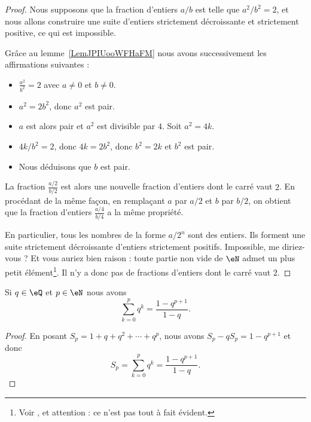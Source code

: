 \begin{proof}
    Nous supposons que la fraction d'entiers \( a/b\) est telle que \( a^2/b^2=2\), et nous allons construire une suite d'entiers strictement décroissante et strictement positive, ce qui est impossible.

    Grâce au lemme~\ref{LemJPIUooWFHaFM} nous avons successivement les affirmations suivantes :
    \begin{itemize}
        \item
        \(\frac{ a^2 }{ b^2 }=2 \)  avec \( a\neq 0\) et \( b\neq 0\).
    \item
        \( a^2=2b^2\), donc \( a^2\) est pair.
    \item
        \( a\) est alors pair et \( a^2\) est divisible par \( 4\). Soit \( a^2=4k\).
    \item
        \( 4k/b^2=2\), donc \( 4k=2b^2\), donc \( b^2=2k\) et \( b^2\) est pair.
    \item
        Nous déduisons que \( b\) est pair.
    \end{itemize}
    La fraction \( \frac{ a/2 }{ b/2 }\) est alors une nouvelle fraction d'entiers dont le carré vaut $2$. En procédant de la même façon, en remplaçant \( a\) par \( a/2\) et \( b\) par \( b/2\), on obtient que la fraction d'entiers \( \frac{ a/4 }{ b/4 }\) a la même propriété.

    En particulier, tous les nombres de la forme \( a/2^n\) sont des entiers.  Ils forment une suite strictement décroissante d'entiers strictement positifs. Impossible, me diriez-vous ? Et vous auriez bien raison : toute partie non vide de \( \eN\) admet un plus petit élément\footnote{Voir \cite{RWWJooJdjxEK}, et attention : ce n'est pas tout à fait évident.}. Il n'y a donc pas de fractions d'entiers dont le carré vaut \( 2\).
\end{proof}

\begin{lemma}      \label{LEMooOTVUooImvusn}
    Si \( q\in \eQ\) et \( p\in \eN\) nous avons
    \begin{equation}
        \sum_{k=0}^pq^k=\frac{ 1-q^{p+1} }{ 1-q }.
    \end{equation}
\end{lemma}

\begin{proof}
    En posant \( S_p=1+q+q^2+\cdots +q^{p}\), nous avons $S_p-qS_p=1-q^{p+1}$ et donc
    \begin{equation}
        S_p=\sum_{k=0}^pq^k=\frac{ 1-q^{p+1} }{ 1-q }.
    \end{equation}
\end{proof}

